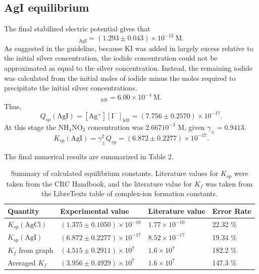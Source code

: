 \documentclass[12pt]{article}
\begin{document}
\subsection*{AgI equilibrium}
The final stabilized electric potential gives that
\begin{equation}
[\mathrm{Ag^+}]_{\mathrm{AgI}}=(1.293\pm0.043)\times10^{-13}\ \mathrm{M}.
\end{equation}
As suggested in the guideline, because KI was added in largely excess relative to the initial silver concentration, the iodide concentration could not be approximated as equal to the silver concentration. Instead, the remaining iodide was calculated from the initial moles of iodide minus the moles required to precipitate the initial silver concentrations.
\begin{equation}
[\mathrm{I^-}]_{\mathrm{left}}=6.00\times10^{-4}\ \mathrm{M}.
\end{equation}
Thus,
\begin{equation}
Q_{sp}(\mathrm{AgI})=[\mathrm{Ag^+}][\mathrm{I^-}]_{\mathrm{left}}=(7.756\pm0.2570)\times10^{-17}.
\end{equation}
At this stage the NH$_4$NO$_3$ concentration was 2.667$10^{-3}$ M, given $\gamma_{\pm}=0.9413$.
\begin{equation}
K_{sp}(\mathrm{AgI})=\gamma_{\pm}^{2}Q_{sp}=(6.872\pm0.2277)\times10^{-17}.
\end{equation}

The final numerical results are summarized in Table 2.

\begin{table}[htb!]
\centering
\caption{Summary of calculated equilibrium constants. Literature values for $K_{sp}$ were taken from the CRC Handbook\cite{lide2002handbook}, and the literature value for $K_f$ was taken from the LibreTexts table\cite{lit_constants} of complex-ion formation constants.}
\label{tab:final}
\begin{tabular}{llll}
\toprule
Quantity & Experimental value & Literature value & Error Rate\\
\midrule
$K_{sp}(\mathrm{AgCl})$ & $(1.375\pm0.1050)\times10^{-10}$ & $1.77\times10^{-10}$  & 22.32 \%\\
$K_{sp}(\mathrm{AgI})$ & $(6.872\pm0.2277)\times10^{-17}$ & $8.52\times10^{-17}$  & 19.34 \%\\
$K_f$ from graph & $(4.515\pm0.2911)\times10^{7}$ & $1.6\times10^{7}$  & 182.2 \%\\
Averaged $K_f$ & $(3.956\pm0.4929)\times10^{7}$ & $1.6\times10^{7}$  & 147.3 \% \\
\bottomrule
\end{tabular}
\end{table}
\end{document}
